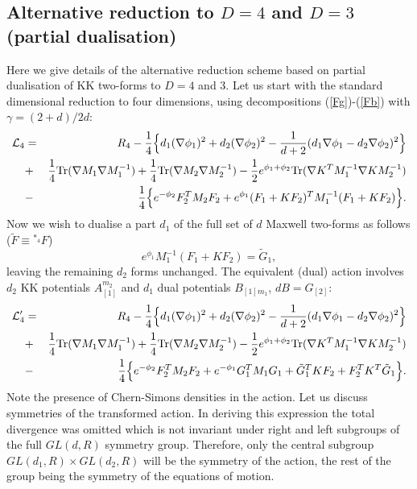 \documentclass[a4paper,12pt]{article}
\def\Tr{{\rm Tr}}
\begin{document}
\begin{appendix}

\section{Alternative reduction to $D=4$ and $D=3$ (partial dualisation)}
Here we give details of the alternative reduction scheme based
on partial dualisation of KK two-forms to $D=4$ and $3$. Let us
start with the standard dimensional reduction to four
dimensions, using decompositions (\ref{Fg})-(\ref{Fb}) with
$\gamma=(2+d)/2d$:
\begin{eqnarray}
{\cal L}_{4} &=& R_{4} - \frac14 \Bigl\{ d_1(\nabla\phi_1)^2 +
d_2(\nabla\phi_2)^2 - \frac1{d+2}(d_1\nabla\phi_1 -
d_2\nabla\phi_2)^2 \Bigr\} \nonumber\\
&+& \frac14 \Tr(\nabla M_1\nabla M_1^{-1}) + \frac14 \Tr(\nabla
M_2 \nabla M_2^{-1}) - \frac12 e^{\phi_1+\phi_2} \Tr(\nabla K^T
M_1^{-1}\nabla K M_2^{-1}) \nonumber\\
&-& \frac14 \Bigl\{e^{-\phi_2}F^T_2 M_2 F_2 + e^{\phi_1}(F_1 + K
F_2)^T M_1^{-1}(F_1 + K F_2) \Bigr\}.
\end{eqnarray}
Now we wish to dualise a part $d_1$ of the full set of $d$
Maxwell two-forms as follows ($\tilde F\equiv {}^{*_4}F$)
\begin{equation}
e^{\phi_1} M_1^{-1}(F_1 + K F_2) = \tilde G_1,
\end{equation}
leaving the remaining $d_2$ forms unchanged. The equivalent (dual)
action involves $d_2$ KK potentials $A_{[1]}^{m_2}$ and $d_1$
dual potentials $B_{[1]m_1}$, $dB=G_{[2]}$:
\begin{eqnarray}\label{L4'}
{\cal L}'_{4} &=& R_{4} - \frac14 \Bigl\{ d_1 (\nabla\phi_1)^2 +
d_2(\nabla\phi_2)^2 - \frac1{d+2}(d_1\nabla\phi_1 -
d_2\nabla\phi_2)^2 \Bigr\} \nonumber\\
&+& \frac14 \Tr(\nabla M_1 \nabla M_1^{-1}) + \frac14 \Tr(\nabla
M_2 \nabla M_2^{-1}) - \frac12 e^{\phi_1+\phi_2} \Tr(\nabla K^T
M_1^{-1} \nabla K M_2^{-1}) \nonumber\\
&-& \frac14 \Bigl\{ e^{-\phi_2} F^T_2 M_2 F_2 + e^{-\phi_1} G_1^T
M_1 G_1 + \tilde G_1^T K F_2 + F_2^T K^T \tilde G_1 \Bigr\}.
\end{eqnarray}
Note the presence of Chern-Simons densities in the action. Let us
discuss symmetries of the transformed action. In deriving this
expression the total divergence was omitted which is not
invariant under right and left subgroups of the full $GL(d,R)$
symmetry group. Therefore, only the central subgroup
$GL(d_1,R)\times GL(d_2,R)$ will be the symmetry of the action,
the rest of the group being the symmetry of the equations of
motion.


\end{appendix}
\end{document}
